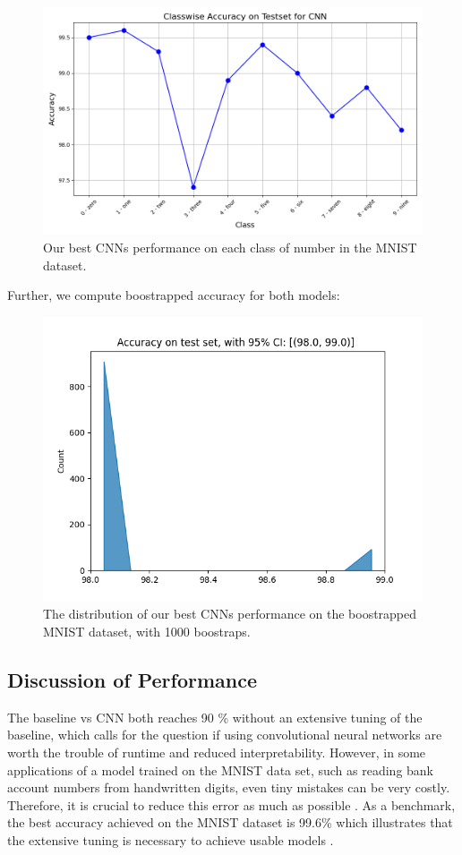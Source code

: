 \begin{figure}[H]
    \centering
    \includegraphics[width=\linewidth]{results/evaluation/CNN_classwise_acc.png}
    \caption{Our best CNNs performance on each class of number in the MNIST dataset.}
    \label{fig:ClasswiseAccuracyCNN}
\end{figure}
\newpage
Further, we compute boostrapped accuracy for both models:
\begin{figure}[H]
    \centering
    \includegraphics[width=\linewidth]{results/evaluation/cnn_confidence.png}
    \caption{The distribution of our best CNNs performance on the boostrapped MNIST dataset, with 1000 boostraps.}
    \label{fig:ClasswiseAccuracyCNN}
\end{figure}

\newpage
\subsection{Discussion of Performance}
The baseline vs CNN both reaches 90 \% without an extensive tuning of the baseline, which calls for the question if using convolutional neural networks are worth the trouble of runtime and reduced interpretability. However, in some applications of a model trained on the MNIST data set, such
as reading bank account numbers from handwritten digits, even tiny mistakes can be very costly.
Therefore, it is crucial to reduce this error as much as possible \cite{raschka2022machine}. As a benchmark, the best accuracy achieved on the MNIST dataset is 99.6\% which illustrates that the extensive tuning is necessary to achieve usable models \cite{simard2003mnist}.

